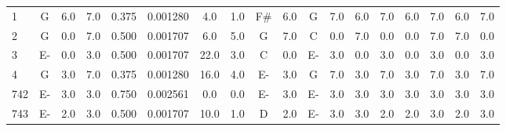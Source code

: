 \begin{table}[H]
\begin{tabular}{|lccccccccccccccccc|}
   1   & G                          & 6.0                         & 7.0                         & 0.375               & 0.001280                    & 4.0                     & 1.0                       & F\#                     & 6.0                        & G                     & 7.0                      & 6.0                   & 7.0                & 6.0               & 7.0               & 6.0                    & 7.0 \\
   2   & G                          & 0.0                         & 7.0                         & 0.500               & 0.001707                    & 6.0                     & 5.0                       & G                       & 7.0                        & C                     & 0.0                      & 7.0                   & 0.0                & 0.0               & 7.0               & 7.0                    & 0.0 \\
   3   & E-                         & 0.0                         & 3.0                         & 0.500               & 0.001707                    & 22.0                    & 3.0                       & C                       & 0.0                        & E-                    & 3.0                      & 0.0                   & 3.0                & 0.0               & 3.0               & 0.0                    & 3.0 \\
   4   & G                          & 3.0                         & 7.0                         & 0.375               & 0.001280                    & 16.0                    & 4.0                       & E-                      & 3.0                        & G                     & 7.0                      & 3.0                   & 7.0                & 3.0               & 7.0               & 3.0                    & 7.0 \\
   742 & E-                         & 3.0                         & 3.0                         & 0.750               & 0.002561                    & 0.0                     & 0.0                       & E-                      & 3.0                        & E-                    & 3.0                      & 3.0                   & 3.0                & 3.0               & 3.0               & 3.0                    & 3.0 \\
   743 & E-                         & 2.0                         & 3.0                         & 0.500               & 0.001707                    & 10.0                    & 1.0                       & D                       & 2.0                        & E-                    & 3.0                      & 3.0                   & 2.0                & 2.0               & 3.0               & 2.0                    & 3.0 \\

\end{tabular}
\end{table}
